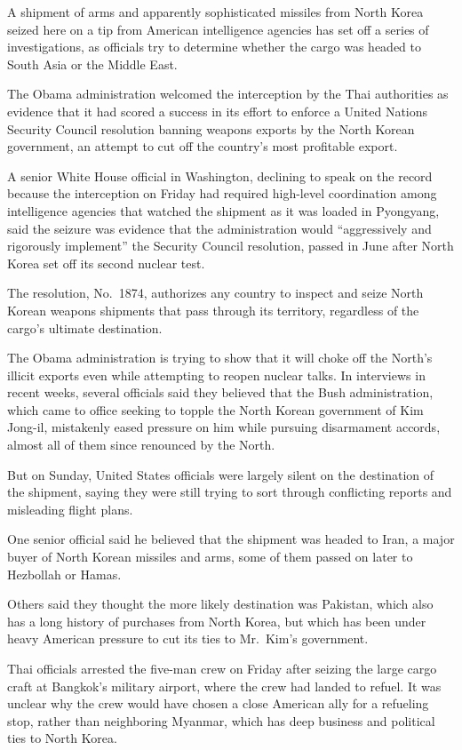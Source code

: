 ﻿\documentclass[12pt]{article}
\begin{document}
\lettrine{A}{} shipment of arms and apparently sophisticated missiles from
North Korea seized here on a tip from American intelligence agencies has set off a series of
investigations, as officials try to determine whether the cargo was headed to South Asia or the
Middle East.

The Obama administration welcomed the interception\cite{interception} by the Thai authorities as
evidence that it had scored a success in its effort to enforce a United Nations Security Council
resolution banning weapons exports by the North Korean government, an attempt to cut off the
country's most profitable export.

A senior White House official in Washington, declining to speak on the record because the
interception on Friday had required high-level coordination among intelligence agencies that watched
the shipment as it was loaded in Pyongyang, said the seizure was evidence that the administration
would ``aggressively and rigorously implement'' the Security Council resolution, passed in June
after North Korea set off its second nuclear test.

The resolution, No.~1874, authorizes any country to inspect and seize North Korean weapons shipments
that pass through its territory, regardless of the cargo's ultimate destination.

The Obama administration is trying to show that it will choke off the North's illicit exports even
while attempting to reopen nuclear talks. In interviews in recent weeks, several officials said they
believed that the Bush administration, which came to office seeking to topple the North Korean
government of Kim Jong-il, mistakenly eased pressure on him while pursuing disarmament accords,
almost all of them since renounced by the North.

But on Sunday, United States officials were largely silent on the destination of the shipment,
saying they were still trying to sort through conflicting reports and misleading flight plans.

One senior official said he believed that the shipment was headed to Iran, a major buyer of North
Korean missiles and arms, some of them passed on later to Hezbollah or Hamas.

Others said they thought the more likely destination was Pakistan, which also has a long history of
purchases from North Korea, but which has been under heavy American pressure to cut its ties to
Mr.~Kim's government.

Thai officials arrested the five-man crew on Friday after seizing the large cargo craft at Bangkok's
military airport, where the crew had landed to refuel. It was unclear why the crew would have chosen
a close American ally for a refueling stop, rather than neighboring Myanmar, which has deep business
and political ties to North Korea.
\end{document}
